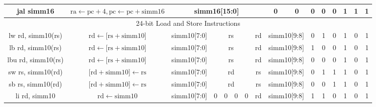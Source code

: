\documentclass[a4paper,10pt]{article}
\begin{document}
\begin{landscape}
\begin{longtable}[c]{|c|c|@{}c@{}|@{}c@{}|@{}c@{}|@{}c@{}|@{}c@{}|@{}c@{}|@{}c@{}|@{}c@{}|@{}c@{}|@{}c@{}|@{}c@{}|@{}c@{}|@{}c@{}|@{}c@{}|@{}c@{}|@{}c@{}|@{}c@{}|@{}c@{}|@{}c@{}|@{}c@{}|@{}c@{}|@{}c@{}|@{}c@{}|@{}c@{}|}
jal simm16            & $\mathrm{ra} \leftarrow \mathrm{pc} + 4, \mathrm{pc} \leftarrow \mathrm{pc} + \mathrm{simm16}$ & \multicolumn{16}{c|}{simm16{[}15:0{]}}                                                                                         & 0              & 0              & 0 & 0   & 0   & 1 & 1 & 1 \\

\hline
\multicolumn{26}{|c|}{24-bit Load and Store Instructions}                                                                                                                                                                                                                                                             \\\hline
lw rd, simm10(rs)     & $\mathrm{rd} \leftarrow {[}\mathrm{rs} + \mathrm{simm10}{]}$ & \multicolumn{8}{c|}{simm10{[}7:0{]}}                        & \multicolumn{4}{c|}{rs}             & \multicolumn{4}{c|}{rd}      & \multicolumn{2}{c|}{simm10{[}9:8{]}} & 0   & 1   & 0   & 1 & 0 & 1 \\
lb rd, simm10(rs)     & $\mathrm{rd} \leftarrow {[}\mathrm{rs} + \mathrm{simm10}{]}$ & \multicolumn{8}{c|}{simm10{[}7:0{]}}                        & \multicolumn{4}{c|}{rs}             & \multicolumn{4}{c|}{rd}      & \multicolumn{2}{c|}{simm10{[}9:8{]}} & 1   & 0   & 0   & 1 & 0 & 1 \\
lbu rd, simm10(rs)    & $\mathrm{rd} \leftarrow {[}\mathrm{rs} + \mathrm{simm10}{]}$ & \multicolumn{8}{c|}{simm10{[}7:0{]}}                        & \multicolumn{4}{c|}{rs}             & \multicolumn{4}{c|}{rd}      & \multicolumn{2}{c|}{simm10{[}9:8{]}} & 0   & 0   & 0   & 1 & 0 & 1 \\
sw rs, simm10(rd)     & ${[}\mathrm{rd} + \mathrm{simm10}{]} \leftarrow \mathrm{rs}$ & \multicolumn{8}{c|}{simm10{[}7:0{]}}                        & \multicolumn{4}{c|}{rd}             & \multicolumn{4}{c|}{rs}      & \multicolumn{2}{c|}{simm10{[}9:8{]}} & 0 & 1   & 1   & 1 & 0 & 1 \\
sb rs, simm10(rd)     & ${[}\mathrm{rd} + \mathrm{simm10}{]} \leftarrow \mathrm{rs}$ & \multicolumn{8}{c|}{simm10{[}7:0{]}}                        & \multicolumn{4}{c|}{rd}             & \multicolumn{4}{c|}{rs}      & \multicolumn{2}{c|}{simm10{[}9:8{]}} & 0   & 0   & 1   & 1 & 0 & 1 \\
li rd, simm10         & $\mathrm{rd} \leftarrow \mathrm{simm10}$ & \multicolumn{8}{c|}{simm10{[}7:0{]}}                        & 0      & 0    & 0    & 0   & \multicolumn{4}{c|}{rd}      & \multicolumn{2}{c|}{simm10{[}9:8{]}} & 1   & 1   & 0   & 1 & 0 & 1 \\


\end{longtable}
\end{landscape}
\end{document}
